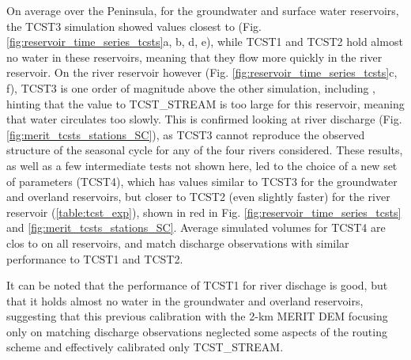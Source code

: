 On average over the Peninsula, for the groundwater and surface water reservoirs, the TCST3 simulation showed values closest to \std (Fig. \ref{fig:reservoir_time_series_tcsts}a, b, d, e), while TCST1 and TCST2 hold almost no water in these reservoirs, meaning that they flow more quickly in the river reservoir. On the river reservoir however (Fig. \ref{fig:reservoir_time_series_tcsts}c, f), TCST3 is one order of magnitude above the other simulation, including \std, hinting that the value to TCST\_STREAM is too large for this reservoir, meaning that water circulates too slowly. This is confirmed looking at river discharge (Fig. \ref{fig:merit_tcsts_stations_SC}), as TCST3 cannot reproduce the observed structure of the seasonal cycle for any of the four rivers considered. These results, as well as a few intermediate tests not shown here, led to the choice of a new set of parameters (TCST4), which has values similar to TCST3 for the groundwater and overland reservoirs, but closer to TCST2 (even slightly faster) for the river reservoir (\ref{table:tcst_exp}), shown in red in Fig. \ref{fig:reservoir_time_series_tcsts} and \ref{fig:merit_tcsts_stations_SC}.
Average simulated volumes for TCST4 are clos to \std on all reservoirs, and match discharge observations with similar performance to TCST1 and TCST2.

It can be noted that the performance of TCST1 for river dischage is good, but that it holds almost no water in the groundwater and overland reservoirs, suggesting that this previous calibration with the 2-km MERIT DEM focusing only on matching discharge observations \citep{kilic_evaluation_2023} neglected some aspects of the routing scheme and effectively calibrated only TCST\_STREAM.


